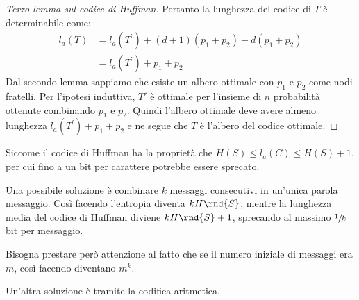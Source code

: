 \documentclass[\main/main.tex]{subfiles}
\begin{document}
\begin{multicols}{2}
\begin{proof}[Terzo lemma sul codice di Huffman]
    Pertanto la lunghezza del codice di \(T\) è determinabile come:
    \begin{align*}
        l_{a}(T)&=l_{a}\left(T^{\prime}\right)+(d+1)\left(p_{1}+p_{2}\right)-d\left(p_{1}+p_{2}\right)\\
        &=l_{a}\left(T^{\prime}\right)+p_{1}+p_{2}
    \end{align*}
    Dal secondo lemma sappiamo che esiste un albero ottimale con \(p_1\) e \(p_2\) come nodi fratelli. Per l'ipotesi induttiva, \(T'\) è ottimale per l'insieme di \(n\) probabilità ottenute combinando \(p_1\) e \(p_2\). Quindi l'albero ottimale deve avere almeno lunghezza \(l_{a}\left(T^{\prime}\right)+p_{1}+p_{2}\) e ne segue che \(T\) è l'albero del codice ottimale.
\end{proof}
\begin{observation}
    Siccome il codice di Huffman ha la proprietà che \(H(S) \leq l_{a}(C) \leq H(S)+1\), per cui fino a un bit per carattere potrebbe essere sprecato.
\end{observation}
\begin{observation}
    Una possibile soluzione è combinare \(k\) messaggi consecutivi in un'unica parola messaggio. Così facendo l'entropia diventa \(k H\rnd{S}\), mentre la lunghezza media del codice di Huffman diviene \(k H\rnd{S} + 1\), sprecando al massimo \(\sfrac{1}{k}\) bit per messaggio. 
    
    Bisogna prestare però attenzione al fatto che se il numero iniziale di messaggi era \(m\), così facendo diventano \(m^k\).

    Un'altra soluzione è tramite la codifica aritmetica.
\end{observation}
\end{multicols}
\end{document}
